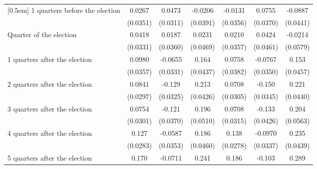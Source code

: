 \begin{table}[!ht]
\begin{tabular}{l*{6}{c}}
[0.5em]
 1 quarters before the election&      0.0267         &      0.0473         &     -0.0206         &     -0.0131         &      0.0755\sym{*}  &     -0.0887\sym{*}  \\
                    &    (0.0351)         &    (0.0311)         &    (0.0391)         &    (0.0356)         &    (0.0370)         &    (0.0441)         \\
[0.5em]
Quarter of the election&      0.0418         &      0.0187         &      0.0231         &      0.0210         &      0.0424         &     -0.0214         \\
                    &    (0.0331)         &    (0.0360)         &    (0.0469)         &    (0.0357)         &    (0.0461)         &    (0.0579)         \\
[0.5em]
 1 quarters after the election&      0.0980\sym{**} &     -0.0655\sym{*}  &       0.164\sym{***}&      0.0758\sym{*}  &     -0.0767\sym{*}  &       0.153\sym{***}\\
                    &    (0.0357)         &    (0.0331)         &    (0.0437)         &    (0.0382)         &    (0.0350)         &    (0.0457)         \\
[0.5em]
 2 quarters after the election&      0.0841\sym{**} &      -0.129\sym{***}&       0.213\sym{***}&      0.0708\sym{*}  &      -0.150\sym{***}&       0.221\sym{***}\\
                    &    (0.0297)         &    (0.0325)         &    (0.0426)         &    (0.0305)         &    (0.0345)         &    (0.0440)         \\
[0.5em]
 3 quarters after the election&      0.0754\sym{*}  &      -0.121\sym{**} &       0.196\sym{***}&      0.0708\sym{*}  &      -0.133\sym{**} &       0.204\sym{***}\\
                    &    (0.0301)         &    (0.0370)         &    (0.0510)         &    (0.0315)         &    (0.0426)         &    (0.0563)         \\
[0.5em]
 4 quarters after the election&       0.127\sym{***}&     -0.0587         &       0.186\sym{***}&       0.138\sym{***}&     -0.0970\sym{**} &       0.235\sym{***}\\
                    &    (0.0283)         &    (0.0353)         &    (0.0460)         &    (0.0278)         &    (0.0337)         &    (0.0439)         \\
[0.5em]
 5 quarters after the election&       0.170\sym{***}&     -0.0711\sym{*}  &       0.241\sym{***}&       0.186\sym{***}&      -0.103\sym{**} &       0.289\sym{***}\\

\end{tabular}
\end{table}
